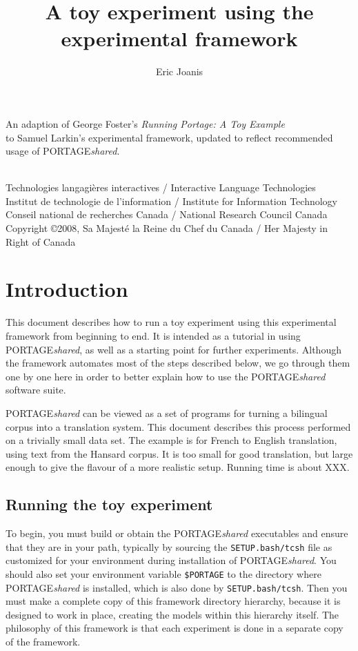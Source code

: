 \documentclass[11pt]{article}
\title{A toy experiment using the \PS \\
       experimental framework}
\date{}
\author{Eric Joanis}
\newcommand{\PS}{PORTAGE\emph{shared}\xspace}
\begin{document}
\maketitle

\begin{center}
An adaption of George Foster's \emph{Running Portage: A Toy Example} \\
to Samuel Larkin's experimental framework, updated to reflect recommended usage
of \PS.
\end{center}

\begin{center}
{~} \\ \tiny
   Technologies langagi{\`e}res interactives /
      Interactive Language Technologies \\
   Institut de technologie de l'information /
      Institute for Information Technology \\
   Conseil national de recherches Canada /
      National Research Council Canada \\
   Copyright \copyright 2008, Sa Majest{\'e} la Reine du Chef du Canada /
      Her Majesty in Right of Canada
\end{center}

\section{Introduction}

This document describes how to run a toy experiment using this experimental
framework from beginning to end.  It is intended as a tutorial in using \PS, as
well as a starting point for further experiments.  Although the framework
automates most of the steps described below, we go through them one by one here
in order to better explain how to use the \PS software suite.

\PS can be viewed as a set of programs for turning a bilingual corpus into a
translation system.  This document describes this process performed on a
trivially small data set.  The example is for French to English translation,
using text from the Hansard corpus.  It is too small for good translation, but
large enough to give the flavour of a more realistic setup. Running time is
about XXX.

\subsection{Running the toy experiment}

To begin, you must build or obtain the \PS executables and ensure that they are
in your path, typically by sourcing the \texttt{SETUP.bash/tcsh} file as
customized for your environment during installation of \PS.  You should also
set your environment variable \texttt{\$PORTAGE} to the directory where \PS is
installed, which is also done by \texttt{SETUP.bash/tcsh}.  Then you must make
a complete copy of this framework directory hierarchy, because it is designed
to work in place, creating the models within this hierarchy itself.  The
philosophy of this framework is that each experiment is done in a separate copy
of the framework.
\end{document}
